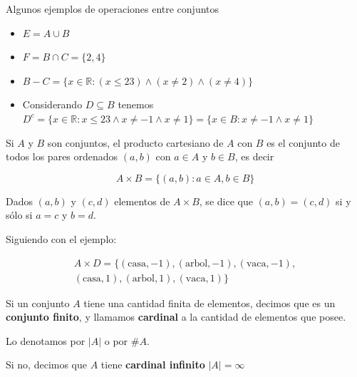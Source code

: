\begin{example}
Algunos ejemplos de operaciones entre conjuntos

\begin{itemize}
\item $ E = A \cup B$

\item $ F = B \cap C = \{2, 4\}$

\item $ B - C = \{ x \in \mathbb{R} : (x \leq 23) \wedge (x \neq 2) \wedge (x \neq 4) \} $

\item Considerando $ D \subseteq B$ tenemos $D^c = \{ x \in \mathbb{R} : x \leq 23 \wedge x \neq -1 \wedge x \neq 1\} = \{ x \in B : x \neq -1 \wedge x \neq 1 \}$

\end{itemize}
\end{example}

\begin{definition} 
Si $A$ y $B$ son conjuntos, el producto cartesiano de $A$ con $B$ es el conjunto de todos los pares ordenados $(a,b)$ con $a \in A$ y $b \in B$, es decir

$$ A \times B = \{(a,b) : a \in A, b \in B \}$$

Dados $(a,b)$ y $(c,d)$ elementos de $A \times B$, se dice que $(a,b) = (c,d)$ si y sólo si $a = c$ y $b = d$.
\end{definition}

\begin{example}
Siguiendo con el ejemplo: 

\begin{eqnarray*}A \times D = \{(\textrm{casa},-1), (\textrm{arbol}, -1), (\textrm{vaca},-1), \\ 
(\textrm{casa},1), (\textrm{arbol},1), (\textrm{vaca},1)\} \end{eqnarray*}
\end{example}

\begin{definition}[Cardinal] 
Si un conjunto $A$ tiene una cantidad finita de elementos, decimos que es un \textbf{conjunto finito}, y llamamos \textbf{cardinal} a la cantidad de elementos que posee.

Lo denotamos por $|A|$ o por $\# A$.

Si no, decimos que $A$ tiene \textbf{cardinal infinito} $|A| = \infty$
\end{definition}

